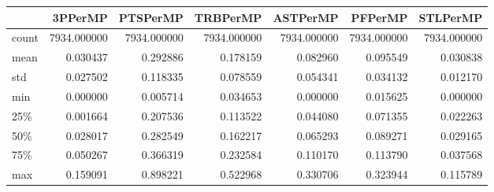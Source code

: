 \begin{tabular}{lrrrrrr}
\toprule
{} &      3PPerMP &     PTSPerMP &     TRBPerMP &     ASTPerMP &      PFPerMP &     STLPerMP \\
\midrule
count &  7934.000000 &  7934.000000 &  7934.000000 &  7934.000000 &  7934.000000 &  7934.000000 \\
mean  &     0.030437 &     0.292886 &     0.178159 &     0.082960 &     0.095549 &     0.030838 \\
std   &     0.027502 &     0.118335 &     0.078559 &     0.054341 &     0.034132 &     0.012170 \\
min   &     0.000000 &     0.005714 &     0.034653 &     0.000000 &     0.015625 &     0.000000 \\
25\%   &     0.001664 &     0.207536 &     0.113522 &     0.044080 &     0.071355 &     0.022263 \\
50\%   &     0.028017 &     0.282549 &     0.162217 &     0.065293 &     0.089271 &     0.029165 \\
75\%   &     0.050267 &     0.366319 &     0.232584 &     0.110170 &     0.113790 &     0.037568 \\
max   &     0.159091 &     0.898221 &     0.522968 &     0.330706 &     0.323944 &     0.115789 \\
\bottomrule
\end{tabular}
